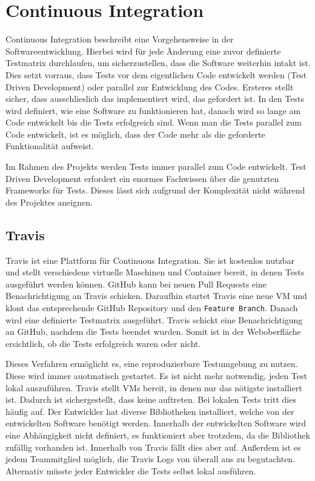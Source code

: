 \section{Continuous Integration}
Continuous Integration beschreibt eine Vorgehensweise in der
Softwareentwicklung. Hierbei wird für jede Änderung eine zuvor definierte
Testmatrix durchlaufen, um sicherzustellen, dass die Software weiterhin intakt
ist. Dies setzt vorraus, dass Tests vor dem eigentlichen Code entwickelt werden
(Test Driven Development) oder parallel zur Entwicklung des Codes. Ersteres
stellt sicher, dass ausschlieslich das implementiert wird, das gefordert ist.
In den Tests wird definiert, wie eine Software zu funktionieren hat, danach
wird so lange am Code entwickelt bis die Tests erfolgreich sind. Wenn man die
Tests parallel zum Code entwickelt, ist es möglich, dass der Code mehr als die
geforderte Funktionalität aufweist.

Im Rahmen des Projekts werden Tests immer parallel zum Code entwickelt. Test
Driven Development erfordert ein enormes Fachwissen über die genutzten
Frameworks für Tests. Dieses lässt sich aufgrund der Komplexität nicht
während des Projektes aneignen.
\tm%

\subsection{Travis}
Travis ist eine Plattform für Continuous Integration. Sie ist kostenlos nutzbar
und stellt verschiedene virtuelle Maschinen und Container bereit, in denen
Tests ausgeführt werden können. GitHub kann bei neuen Pull Requests eine
Benachrichtigung an Travis schicken. Daraufhin startet Travis eine neue VM und
klont das entsprechende GitHub Repository und den \texttt{Feature Branch}.
Danach wird eine definierte Testmatrix ausgeführt. Travis schickt eine
Benachrichtigung an GitHub, nachdem die Tests beendet wurden. Somit ist in der
Weboberfläche ersichtlich, ob die Tests erfolgreich waren oder nicht.

Dieses Verfahren ermöglicht es, eine reproduzierbare Testumgebung zu nutzen.
Diese wird immer auotmatisch gestartet. Es ist nicht mehr notwendig, jeden Test
lokal auszuführen. Travis stellt VMs bereit, in denen nur das nötigste
installiert ist. Dadurch ist sichergestellt, dass keine  auftreten. Bei lokalen Tests tritt dies häufig auf. Der
Entwickler hat diverse Bibliotheken installiert, welche von der entwickelten
Software benötigt werden. Innerhalb der entwickelten Software wird eine
Abhängigkeit nicht definiert, es funktioniert aber trotzdem, da die Bibliothek
zufällig vorhanden ist. Innerhalb von Travis fällt dies aber auf. Außerdem ist
es jedem Teammitglied möglich, die Travis Logs von überall aus zu begutachten.
Alternativ müsste jeder Entwickler die Tests selbst lokal ausführen.
\tm%

